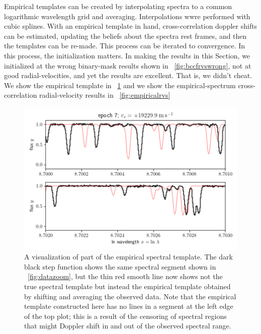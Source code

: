 \documentclass[modern]{aastex631}
\newcommand{\sectionname}{Section}
\newcommand{\figref}[1]{\figurename~\ref{#1}}
\begin{document}
Empirical templates can be created by interpolating spectra to a common logarithmic wavelength grid and averaging.
Interpolations wwre performed with cubic splines.
With an empirical template in hand, cross-correlation doppler shifts can be estimated, updating the beliefs about the spectra rest frames, and then the templates can be re-made.
This process can be iterated to convergence.
In this process, the initialization matters.
In making the results in this \sectionname, we initialized at the wrong binary-mask results shown in \figref{fig:bccfrvswrong}, not at good radial-velocities, and yet the results are excellent.
That is, we didn't cheat.
We show the empirical template in \figref{fig:empirical} and we show the
empirical-spectrum cross-correlation radial-velocity results in \figref{fig:empiricalrvs}

\begin{figure}[tp]
  \begin{mdframed}
    \begin{center}
    \includegraphics[width=\textwidth]{../notebook/empirical.png}
    \end{center}
    \caption{A visualization of part of the empirical spectral template. The dark black step function shows the same spectral segment shown in \figref{fig:datazoom}, but the thin red smooth line now shows not the true spectral template but instead the empirical template obtained by shifting and averaging the observed data. Note that the empirical template constructed here has no lines in a segment at the left edge of the top plot; this is a result of the censoring of spectral regions that might Doppler shift in and out of the observed spectral range.\label{fig:empirical}}
  \end{mdframed}
\end{figure}
\end{document}
